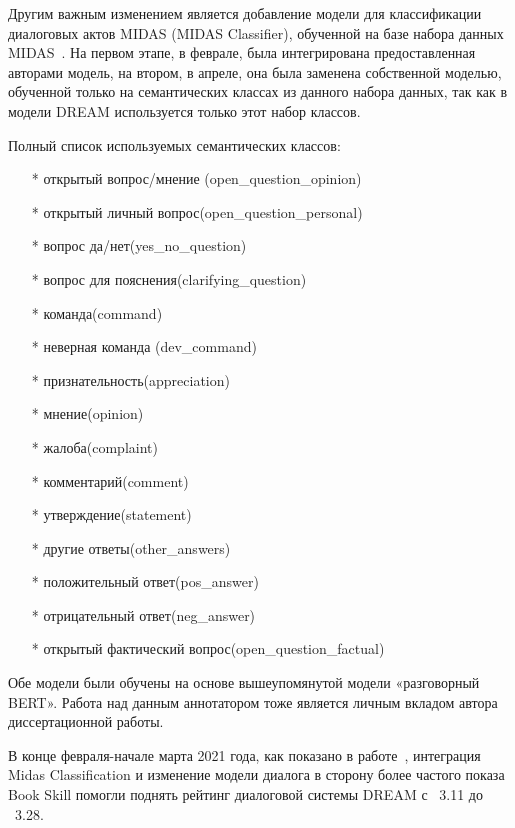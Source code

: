 Другим важным изменением является добавление модели для классификации диалоговых актов MIDAS (MIDAS Classifier), обученной на базе набора данных MIDAS~\cite{midas}. На первом этапе, в феврале, была интегрирована предоставленная авторами модель, на втором, в апреле, она была заменена собственной моделью, обученной только на семантических классах из данного набора данных, так как в модели {DREAM} используется только этот набор классов.


Полный список используемых семантических классов:
\begin{itemize}
\item[*] открытый вопрос/мнение (open\_question\_opinion)
\item[*] открытый личный вопрос(open\_question\_personal)
\item[*] вопрос да/нет(yes\_no\_question)
\item[*] вопрос для пояснения(clarifying\_question)
\item[*] команда(command)
\item[*] неверная команда (dev\_command)
\item[*] признательность(appreciation)
\item[*] мнение(opinion)
\item[*] жалоба(complaint)
\item[*] комментарий(comment)
\item[*] утверждение(statement)
\item[*] другие ответы(other\_answers)
\item[*] положительный ответ(pos\_answer)
\item[*] отрицательный ответ(neg\_answer)
\item[*] открытый фактический вопрос(open\_question\_factual)
\end{itemize}
Обе модели были обучены на основе вышеупомянутой модели «разговорный BERT».  Работа над данным аннотатором тоже является личным вкладом автора диссертационной работы.

В конце февраля-начале марта 2021 года, как показано  в работе~\cite{dream2}, интеграция Midas Classification и изменение модели диалога в сторону более частого показа Book Skill помогли поднять рейтинг диалоговой системы {DREAM} с ~3.11 до ~3.28.



